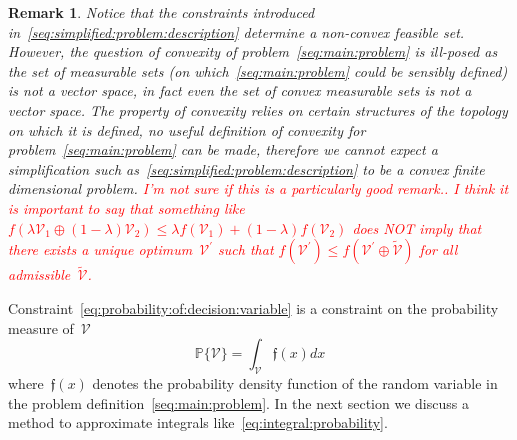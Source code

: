 \documentclass[letterpaper, 10pt, conference]{ieeeconf} %
\newtheorem{rem}[thm]{Remark}
\begin{document}
\begin{rem}
Notice that the constraints introduced in~\eqref{seq:simplified:problem:description} determine a non-convex feasible set. 
%
However, the question of convexity of problem~\eqref{seq:main:problem} is ill-posed as the set of measurable sets (on which~\eqref{seq:main:problem} could be sensibly defined) is not a vector space, in fact even the set of convex measurable sets is not a vector space.
%
The property of convexity relies on certain structures of the topology on which it is defined, no useful definition of convexity for problem~\eqref{seq:main:problem} can be made, therefore we cannot expect a simplification such as~\eqref{seq:simplified:problem:description} to be a convex finite dimensional problem.
\textcolor{red}{I'm not sure if this is a particularly good remark.. I think it is important to say that something like~$f(\lambda\mathcal V_1\oplus(1-\lambda)\mathcal V_2)\leq\lambda f(\mathcal V_1)+(1-\lambda)f(\mathcal V_2)$ does NOT imply that there exists a unique optimum~$\mathcal V^\prime$ such that $f(\mathcal V^\prime)\leq f(\mathcal V^\prime\oplus\tilde{\mathcal V})$ for all admissible~$\tilde{\mathcal V}$.}
\end{rem}
%
\noindent Constraint~\eqref{eq:probability:of:decision:variable} is a constraint on the probability measure of~$\mathcal V$
%
\begin{equation}\label{eq:integral:probability}
	\mathbb P\{\mathcal V\} = \int_{\mathcal V}\mathfrak f(x)dx
\end{equation}
%
where~$\mathfrak f(x)$ denotes the probability density function of the random variable in the problem definition~\eqref{seq:main:problem}.
%
In the next section we discuss a method to approximate integrals like~\eqref{eq:integral:probability}.
\end{document}
